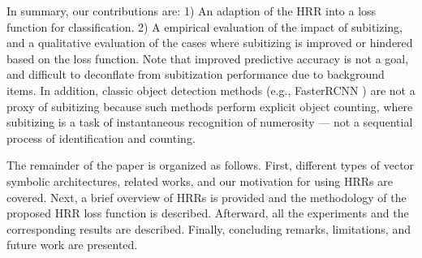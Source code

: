 \documentclass[letterpaper]{article} %
\begin{document}
\par
In summary, our contributions are: 1) An adaption of the HRR into a loss function for classification. 2) A empirical evaluation of the impact of subitizing, and a qualitative evaluation of the cases where subitizing is improved or hindered based on the loss function. Note that improved predictive accuracy is not a goal, and difficult to deconflate from subitization performance due to background items. In addition, classic object detection methods (e.g., FasterRCNN \cite{ren2015faster}) are not a proxy of subitizing because such methods perform explicit object counting, where subitizing is a task of instantaneous recognition of numerosity --- not a sequential process of identification and counting.
\par
The remainder of the paper is organized as follows. First, different types of vector symbolic architectures, related works, and our motivation for using HRRs are covered. Next, a brief overview of HRRs is provided and the methodology of the proposed HRR loss function is described. Afterward, all the experiments and the corresponding results are described. Finally, concluding remarks, limitations, and future work are presented.
\end{document}
